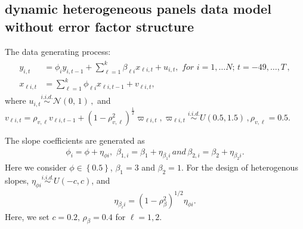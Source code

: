 \documentclass[12pt,a4paper,hyperref]{article}
\begin{document}
\subsection{dynamic heterogeneous panels data model without error factor structure}
The data generating process:
\begin{align}
\begin{split}
y_{i,t}&= \phi_{i} y_{i,t-1}+ \sum^{k}_{\ell=1}\beta_{\ell i}x_{\ell i,t}+u_{i,t}, \,\, for\,\,i=1,\ldots N;\,t=-49,\ldots,T\, , \\ \label{M1}
x_{\ell i,t}&=\sum^{k}_{\ell=1}\phi_{\ell i}x_{\ell i,t-1}+v_{\ell i,t},
\end{split}
\end{align}
where $u_{i,t}\overset{i.i.d.}{\sim} \mathcal{N}(0,\,1)\,,$ and $v_{\ell i,t}=\rho_{v, \ell}v_{\ell i,t-1}+\left( 1-\rho^{2}_{v, \ell} \right)^{\frac{1}{2}}\varpi_{\ell i,t}, \varpi_{\ell i,t} \overset{i.i.d.}{\sim} U(0.5, 1.5) \, ,\rho_{v, \ell}=0.5.$

The slope coefficients are generated as
\begin{align}
\phi_{i}=\phi+\eta_{\phi i},\,\, \beta_{1,i}=\beta_{1}+\eta_{\beta_{1} i}\, and\, \beta_{2,i}=\beta_{2}+\eta_{\beta_{2}i}.
\end{align}
Here we consider $\phi \in \left\{0.5 \right\}$, $\beta_{1}=3$ and $\beta_{2}=1$. For the design of heterogenous slopes, $\eta_{\phi i} \overset{i.i.d.}{\sim} U\left( -c, c\right)$, and
\begin{align}
\eta_{\beta_{\ell}i}= \left(1-\rho^{2}_{\beta}  \right)^{1/2}\eta_{\phi i}.
\end{align}
Here, we set $c=0.2,\, \rho_{\beta}=0.4$ for $\ell=1,2.$
\end{document}
